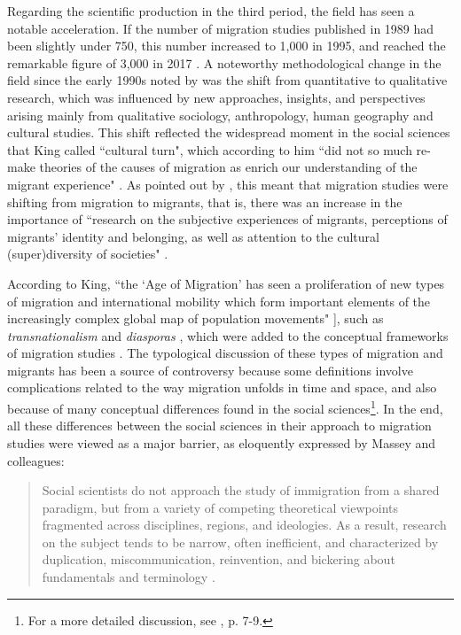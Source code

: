 Regarding the scientific production in the third period, the field has seen a notable acceleration. If the number of migration studies published in 1989 had been slightly under 750, this number increased to 1,000 in 1995, and reached the remarkable figure of 3,000 in 2017 \citep{levy_between_2020, scholten_introduction_2022}. A noteworthy methodological change in the field since the early 1990s noted by \cite{king_theories_2012} was the shift from quantitative to qualitative research, which was influenced by new approaches, insights, and perspectives arising mainly from qualitative sociology, anthropology, human geography and cultural studies. This shift reflected the widespread moment in the social sciences that King called ``cultural turn", which according to him ``did not so much re-make theories of the causes of migration as enrich our understanding of the migrant experience" \citep[p. 25]{king_theories_2012}. As pointed out by \cite{scholten_introduction_2022}, this meant that migration studies were shifting from migration to migrants, that is, there was an increase in the importance of ``research on the subjective experiences of migrants, perceptions of migrants’ identity and belonging, as well as attention to the cultural (super)diversity of societies" \citep[p. 21]{scholten_introduction_2022}.

According to King, ``the `Age of Migration' has seen a proliferation of new types of migration and international mobility which form important elements of the increasingly complex global map of population movements" \citep[p. 9]{king_theories_2012}], such as \textit{transnationalism} \citep{schiller_transnationalism_1992} and \textit{diasporas} \citep{cohen_global_2008}, which were added to the conceptual frameworks of migration studies \citep{king_theories_2012}. The typological discussion of these types of migration and migrants has been a source of controversy because some definitions involve complications related to the way migration unfolds in time and space, and also because of many conceptual differences found in the social sciences\footnote{For a more detailed discussion, see \cite{king_theories_2012}, p. 7-9.}. In the end, all these differences between the social sciences in their approach to migration studies were viewed as a major barrier, as eloquently expressed by Massey and colleagues:

\begin{quote}
Social scientists do not approach the study of immigration from a shared paradigm, but from a variety of competing theoretical viewpoints fragmented across disciplines, regions, and ideologies. As a result, research on the subject tends to be narrow, often inefficient, and characterized by duplication, miscommunication, reinvention, and bickering about fundamentals and terminology \citep[p. 700-701]{massey_evaluation_1994}.
\end{quote}

